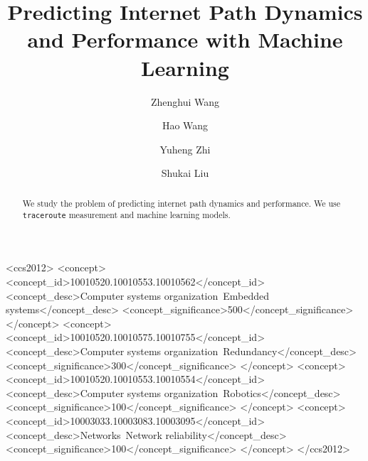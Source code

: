 \documentclass[sigconf]{acmart}
\begin{document}
	\title{Predicting Internet Path Dynamics and Performance with Machine Learning}
	
	
	\author{Zhenghui Wang}
	
	\author{Hao Wang}
	
	\author{Yuheng Zhi}
	
	\author{Shukai Liu}
	
	\renewcommand{\shortauthors}{CN Group}
	
	
	\begin{abstract}
		We study the problem of predicting internet path dynamics and performance. We use \texttt{traceroute} measurement and machine learning models.
	\end{abstract}
	
	\begin{CCSXML}
		<ccs2012>
		<concept>
		<concept_id>10010520.10010553.10010562</concept_id>
		<concept_desc>Computer systems organization~Embedded systems</concept_desc>
		<concept_significance>500</concept_significance>
		</concept>
		<concept>
		<concept_id>10010520.10010575.10010755</concept_id>
		<concept_desc>Computer systems organization~Redundancy</concept_desc>
		<concept_significance>300</concept_significance>
		</concept>
		<concept>
		<concept_id>10010520.10010553.10010554</concept_id>
		<concept_desc>Computer systems organization~Robotics</concept_desc>
		<concept_significance>100</concept_significance>
		</concept>
		<concept>
		<concept_id>10003033.10003083.10003095</concept_id>
		<concept_desc>Networks~Network reliability</concept_desc>
		<concept_significance>100</concept_significance>
		</concept>
		</ccs2012>  
	\end{CCSXML}
	
\end{document}
